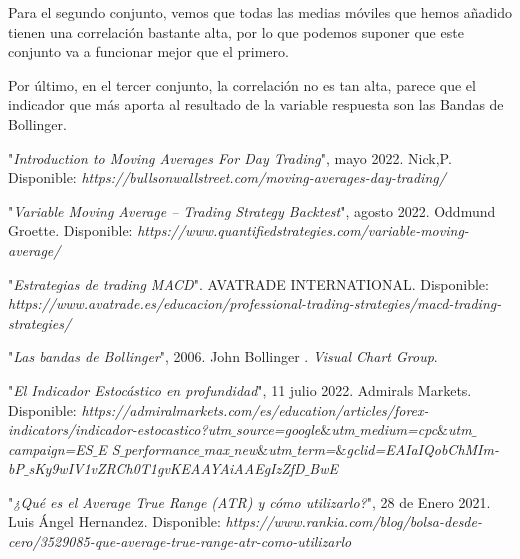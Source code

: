 \documentclass[11pt]{article} %
\begin{document}
Para el segundo conjunto, vemos que todas las medias móviles que hemos añadido tienen una correlación bastante alta, por lo que podemos suponer que este conjunto va a funcionar mejor que el primero.

Por último, en el tercer conjunto, la correlación no es tan alta, parece que el indicador que más aporta al resultado de la variable respuesta son las Bandas de Bollinger.
























\newpage

\begin{thebibliography}{999999}
	
	 "\textit{Introduction to Moving Averages For Day Trading}", mayo 2022. Nick,P. Disponible: \textit{https://bullsonwallstreet.com/moving-averages-day-trading/}
	
	 "\textit{Variable Moving Average – Trading Strategy Backtest}", agosto 2022. Oddmund Groette. Disponible: \textit{https://www.quantifiedstrategies.com/variable-moving-average/}
	
	 "\textit{Estrategias de trading MACD}". AVATRADE INTERNATIONAL. Disponible: \textit{https://www.avatrade.es/educacion/professional-trading-strategies/macd-trading-strategies/}
	
	 "\textit{Las bandas de Bollinger}", 2006. John Bollinger . \textit{Visual Chart Group}. 
	
	 "\textit{El Indicador Estocástico en profundidad}", 11 julio 2022. Admirals Markets. Disponible: \textit{https://admiralmarkets.com/es/education/articles/forex-indicators/indicador-estocastico?utm$\_$source=google$\&$utm$\_$medium=cpc$\&$utm$\_$campaign=ES$\_$E	
	S$\_$performance$\_$max$\_$new$\&$utm$\_$term=$\&$gclid=EAIaIQobChMIm-bP$\_$sKy9wIV1vZRCh0T1gvKEAAYAiAAEgIzZfD$\_$BwE}	
	
	 "\textit{¿Qué es el Average True Range (ATR) y cómo utilizarlo?}", 28 de Enero 2021. Luis Ángel Hernandez. Disponible: \textit{https://www.rankia.com/blog/bolsa-desde-cero/3529085-que-average-true-range-atr-como-utilizarlo}		
	
\end{thebibliography}
\end{document}
